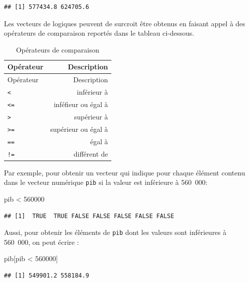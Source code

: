 \documentclass[
  11pt,
]{book}
\newenvironment{Shaded}{\begin{snugshade}}{\end{snugshade}}
\newcommand{\DecValTok}[1]{\textcolor[rgb]{0.00,0.00,0.81}{#1}}
\newcommand{\NormalTok}[1]{#1}
\newcommand{\SpecialCharTok}[1]{\textcolor[rgb]{0.00,0.00,0.00}{#1}}
\numberwithin{equation}{section}
\numberwithin{countremarque}{section}
\begin{document}
\begin{lstlisting}
## [1] 577434.8 624705.6
\end{lstlisting}

Les vecteurs de logiques peuvent de surcroit être obtenus en faisant appel à des opérateurs de comparaison reportés dans le tableau ci-dessous.

\begin{longtable}[]{@{}lr@{}}
\caption{\label{tab:operateurs-comparaison} Opérateurs de comparaison}\tabularnewline
\toprule
Opérateur & Description \\
\midrule
\endfirsthead
\toprule
Opérateur & Description \\
\midrule
\endhead
\texttt{\textless{}} & inférieur à \\
\texttt{\textless{}=} & inféfieur ou égal à \\
\texttt{\textgreater{}} & supérieur à \\
\texttt{\textgreater{}=} & supérieur ou égal à \\
\texttt{==} & égal à \\
\texttt{!=} & différent de \\
\bottomrule
\end{longtable}

Par exemple, pour obtenir un vecteur qui indique pour chaque élément contenu dans le vecteur numérique \texttt{pib} si la valeur est inférieure à 560~000:

\begin{Shaded}
\begin{Highlighting}[]
\NormalTok{pib }\SpecialCharTok{\textless{}} \DecValTok{560000}
\end{Highlighting}
\end{Shaded}

\begin{lstlisting}
## [1]  TRUE  TRUE FALSE FALSE FALSE FALSE FALSE
\end{lstlisting}

Aussi, pour obtenir les éléments de \texttt{pib} dont les valeurs sont inférieures à 560~000, on peut écrire :

\begin{Shaded}
\begin{Highlighting}[]
\NormalTok{pib[pib }\SpecialCharTok{\textless{}} \DecValTok{560000}\NormalTok{]}
\end{Highlighting}
\end{Shaded}

\begin{lstlisting}
## [1] 549901.2 558184.9
\end{lstlisting}
\end{document}
